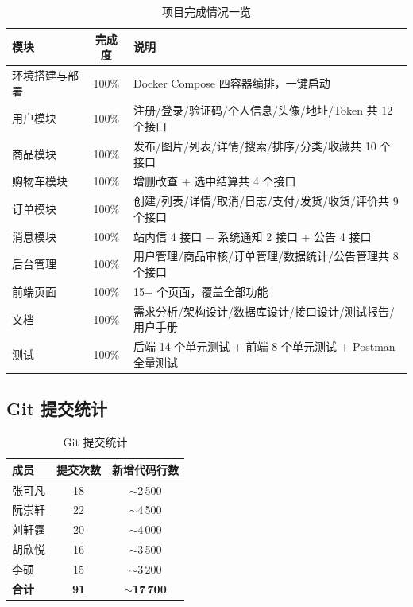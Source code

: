 \documentclass[12pt,a4paper,UTF8]{ctexart}
\begin{document}
\begin{table}[H]
\centering
\caption{项目完成情况一览}
\begin{tabularx}{\textwidth}{l c X}
\toprule
\textbf{模块} & \textbf{完成度} & \textbf{说明} \\
\midrule
环境搭建与部署 & 100\% & Docker Compose 四容器编排，一键启动 \\
用户模块 & 100\% & 注册/登录/验证码/个人信息/头像/地址/Token 共 12 个接口 \\
商品模块 & 100\% & 发布/图片/列表/详情/搜索/排序/分类/收藏共 10 个接口 \\
购物车模块 & 100\% & 增删改查 + 选中结算共 4 个接口 \\
订单模块 & 100\% & 创建/列表/详情/取消/日志/支付/发货/收货/评价共 9 个接口 \\
消息模块 & 100\% & 站内信 4 接口 + 系统通知 2 接口 + 公告 4 接口 \\
后台管理 & 100\% & 用户管理/商品审核/订单管理/数据统计/公告管理共 8 个接口 \\
前端页面 & 100\% & 15+ 个页面，覆盖全部功能 \\
文档 & 100\% & 需求分析/架构设计/数据库设计/接口设计/测试报告/用户手册 \\
测试 & 100\% & 后端 14 个单元测试 + 前端 8 个单元测试 + Postman 全量测试 \\
\bottomrule
\end{tabularx}
\end{table}

\subsection{Git 提交统计}

\begin{table}[H]
\centering
\caption{Git 提交统计}
\begin{tabularx}{\textwidth}{l c c}
\toprule
\textbf{成员} & \textbf{提交次数} & \textbf{新增代码行数} \\
\midrule
张可凡 & 18 & $\sim$2\,500 \\
阮崇轩 & 22 & $\sim$4\,500 \\
刘轩霆 & 20 & $\sim$4\,000 \\
胡欣悦 & 16 & $\sim$3\,500 \\
李硕 & 15 & $\sim$3\,200 \\
\midrule
\textbf{合计} & \textbf{91} & \textbf{$\sim$17\,700} \\
\bottomrule
\end{tabularx}
\end{table}
\end{document}
